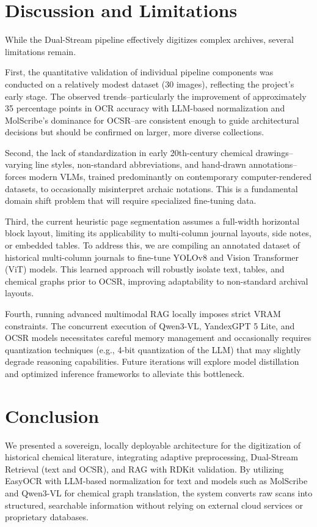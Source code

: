 \documentclass[conference]{IEEEtran}
\begin{document}
\section{Discussion and Limitations}

While the Dual-Stream pipeline effectively digitizes complex archives, several limitations remain.

First, the quantitative validation of individual pipeline components was conducted on a relatively modest dataset (30 images), reflecting the project's early stage. The observed trends--particularly the improvement of approximately 35 percentage points in OCR accuracy with LLM-based normalization and MolScribe's dominance for OCSR--are consistent enough to guide architectural decisions but should be confirmed on larger, more diverse collections.

Second, the lack of standardization in early 20th-century chemical drawings--varying line styles, non-standard abbreviations, and hand-drawn annotations--forces modern VLMs, trained predominantly on contemporary computer-rendered datasets, to occasionally misinterpret archaic notations. This is a fundamental domain shift problem that will require specialized fine-tuning data.

Third, the current heuristic page segmentation assumes a full-width horizontal block layout, limiting its applicability to multi-column journal layouts, side notes, or embedded tables. To address this, we are compiling an annotated dataset of historical multi-column journals to fine-tune YOLOv8 and Vision Transformer (ViT) models. This learned approach will robustly isolate text, tables, and chemical graphs prior to OCSR, improving adaptability to non-standard archival layouts.

Fourth, running advanced multimodal RAG locally imposes strict VRAM constraints. The concurrent execution of Qwen3-VL, YandexGPT 5 Lite, and OCSR models necessitates careful memory management and occasionally requires quantization techniques (e.g., 4-bit quantization of the LLM) that may slightly degrade reasoning capabilities. Future iterations will explore model distillation and optimized inference frameworks to alleviate this bottleneck.

\section{Conclusion}

We presented a sovereign, locally deployable architecture for the digitization of historical chemical literature, integrating adaptive preprocessing, Dual-Stream Retrieval (text and OCSR), and RAG with RDKit validation. By utilizing EasyOCR with LLM-based normalization for text and models such as MolScribe and Qwen3-VL for chemical graph translation, the system converts raw scans into structured, searchable information without relying on external cloud services or proprietary databases.
\end{document}
